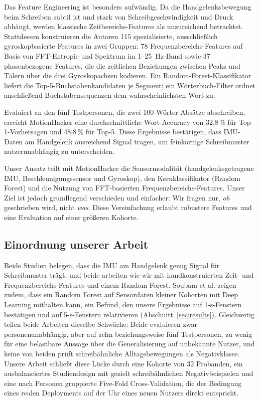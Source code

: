 Das Feature Engineering ist besonders aufwändig. Da die Handgelenksbewegung beim Schreiben subtil ist und stark von Schreibgeschwindigkeit und Druck abhängt, werden klassische Zeitbereichs-Features als unzureichend betrachtet. Stattdessen konstruieren die Autoren 115 spezialisierte, ausschließlich gyroskopbasierte Features in zwei Gruppen: 78 Frequenzbereichs-Features auf Basis von FFT-Entropie und Spektrum im 1--25~Hz-Band sowie 37 phasenbezogene Features, die die zeitlichen Beziehungen zwischen Peaks und Tälern über die drei Gyroskopachsen kodieren. Ein Random-Forest-Klassifikator liefert die Top-5-Buchstabenkandidaten je Segment; ein Wörterbuch-Filter ordnet anschließend Buchstabensequenzen dem wahrscheinlichsten Wort zu.

Evaluiert an den fünf Testpersonen, die zwei 100-Wörter-Absätze abschreiben, erreicht MotionHacker eine durchschnittliche Wort-Accuracy von 32,8\,\% für Top-1-Vorhersagen und 48,8\,\% für Top-5. Diese Ergebnisse bestätigen, dass IMU-Daten am Handgelenk ausreichend Signal tragen, um feinkörnige Schreibmuster nutzerunabhängig zu unterscheiden.

Unser Ansatz teilt mit MotionHacker die Sensormodalität (handgelenksgetragene IMU, Beschleunigungssensor und Gyroskop), den Kernklassifikator (Random Forest) und die Nutzung von FFT-basierten Frequenzbereichs-Features. Unser Ziel ist jedoch grundlegend verschieden und einfacher: Wir fragen nur, \textit{ob} geschrieben wird, nicht \textit{was}. Diese Vereinfachung erlaubt robustere Features und eine Evaluation auf einer größeren Kohorte.

\subsection{Einordnung unserer Arbeit}

Beide Studien belegen, dass die IMU am Handgelenk genug Signal für Schreibmuster trägt, und beide arbeiten wie wir mit handkonstruierten Zeit- und Frequenzbereichs-Features und einem Random Forest. Soubam et al. zeigen zudem, dass ein Random Forest auf Sensordaten kleiner Kohorten mit Deep Learning mithalten kann, ein Befund, den unsere Ergebnisse auf 1-s-Fenstern bestätigen und auf 5-s-Fenstern relativieren (Abschnitt~\ref{sec:results}). Gleichzeitig teilen beide Arbeiten dieselbe Schwäche: Beide evaluieren zwar personenunabhängig, aber auf zehn beziehungsweise fünf Testpersonen, zu wenig für eine belastbare Aussage über die Generalisierung auf unbekannte Nutzer, und keine von beiden prüft schreibähnliche Alltagsbewegungen als Negativklasse. Unsere Arbeit schließt diese Lücke durch eine Kohorte von 32 Probanden, ein ausbalanciertes Studiendesign mit gezielt schreibähnlichen Negativbeispielen und eine nach Personen gruppierte Five-Fold Cross-Validation, die der Bedingung eines realen Deployments auf der Uhr eines neuen Nutzers direkt entspricht.
